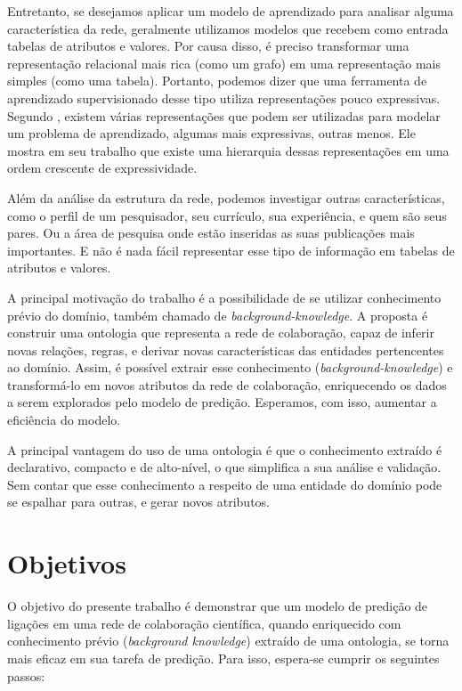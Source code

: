 Entretanto, se desejamos aplicar um modelo de aprendizado para analisar alguma característica da rede, geralmente utilizamos modelos que recebem como entrada tabelas de atributos e valores. Por causa disso, é preciso transformar uma representação relacional mais rica (como um grafo) em uma representação mais simples (como uma tabela). Portanto, podemos dizer que uma ferramenta de aprendizado supervisionado desse tipo utiliza representações pouco expressivas. Segundo \citet{Raedt2008}, existem várias representações que podem ser utilizadas para modelar um problema de aprendizado, algumas mais expressivas, outras menos. Ele mostra em seu trabalho que existe uma hierarquia dessas representações em uma ordem crescente de expressividade.

Além da análise da estrutura da rede, podemos investigar outras características, como o perfil de um pesquisador, seu currículo, sua experiência, e quem são seus pares. Ou a área de pesquisa onde estão inseridas as suas publicações mais importantes. E não é nada fácil representar esse tipo de informação em tabelas de atributos e valores.

A principal motivação do trabalho é a possibilidade de se utilizar conhecimento prévio do domínio, também chamado de \textit{background-knowledge}. A proposta é construir uma ontologia que representa a rede de colaboração, capaz de inferir novas relações, regras, e derivar novas características das entidades pertencentes ao domínio. Assim, é possível extrair esse conhecimento (\textit{background-knowledge}) e transformá-lo em novos atributos da rede de colaboração, enriquecendo os dados a serem explorados pelo modelo de predição. Esperamos, com isso, aumentar a eficiência do modelo.

 A principal vantagem do uso de uma ontologia é que o conhecimento extraído é declarativo, compacto e de alto-nível, o que simplifica a sua análise e validação. Sem contar que esse conhecimento a respeito de uma entidade do domínio pode se espalhar para outras, e gerar novos atributos.


\section{Objetivos}
\label{sec:objetivos}

O objetivo do presente trabalho é demonstrar que um modelo de predição de ligações em uma rede de colaboração científica, quando enriquecido com conhecimento prévio (\textit{background knowledge}) extraído de uma ontologia, se torna mais eficaz em sua tarefa de predição.
Para isso, espera-se cumprir os seguintes passos:

